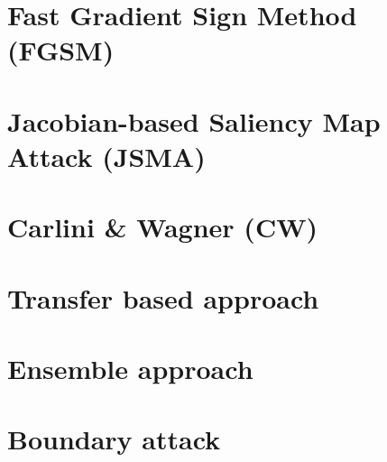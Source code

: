 \section{Fast Gradient Sign Method (FGSM)}
\label{sec:FGSM}



\section{Jacobian-based Saliency Map Attack (JSMA)}
\label{sec:JSMA}


 
\section{Carlini \& Wagner (CW)}
\label{sec:CW}



\section{Transfer based approach}
\label{sec:transfer-based}



\section{Ensemble approach} 
\label{sec:ensemble-approach}



\section{Boundary attack}
\label{boundary-attack}


